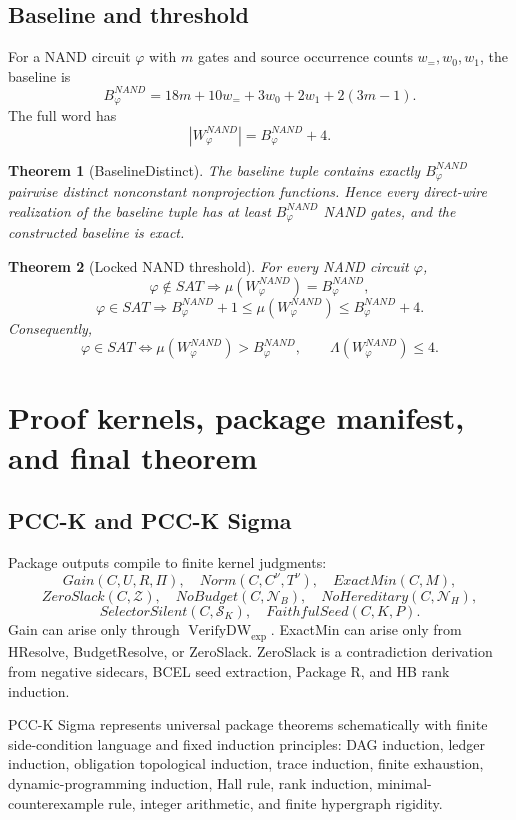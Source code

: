 \documentclass[10.5pt,a4paper]{article}
\newtheorem{theorem}{Theorem}[section]
\newcommand{\VerifyDW}{\operatorname{VerifyDW}_{\exp}}
\begin{document}
\subsection{Baseline and threshold}
For a NAND circuit \(\varphi\) with \(m\) gates and source occurrence counts \(w_=,w_0,w_1\), the baseline is
\[
B^{NAND}_\varphi=18m+10w_=+3w_0+2w_1+2(3m-1).
\]
The full word has
\[
|W^{NAND}_\varphi|=B^{NAND}_\varphi+4.
\]

\begin{theorem}[BaselineDistinct]
The baseline tuple contains exactly \(B^{NAND}_\varphi\) pairwise distinct nonconstant nonprojection functions. Hence every direct-wire realization of the baseline tuple has at least \(B^{NAND}_\varphi\) NAND gates, and the constructed baseline is exact.
\end{theorem}

\begin{theorem}[Locked NAND threshold]
For every NAND circuit \(\varphi\),
\[
\varphi\notin SAT\Longrightarrow \mu(W^{NAND}_\varphi)=B^{NAND}_\varphi,
\]
\[
\varphi\in SAT\Longrightarrow B^{NAND}_\varphi+1\le\mu(W^{NAND}_\varphi)\le B^{NAND}_\varphi+4.
\]
Consequently,
\[
\varphi\in SAT\Longleftrightarrow \mu(W^{NAND}_\varphi)>B^{NAND}_\varphi,
\qquad
\Lambda(W^{NAND}_\varphi)\le4.
\]
\end{theorem}

\section{Proof kernels, package manifest, and final theorem}

\subsection{PCC-K and PCC-K Sigma}
Package outputs compile to finite kernel judgments:
\[
Gain(C,U,R,\Pi),\quad Norm(C,C^\nu,T^\nu),\quad ExactMin(C,M),
\]
\[
ZeroSlack(C,\mathcal Z),\quad NoBudget(C,\mathcal N_B),\quad NoHereditary(C,\mathcal N_H),
\]
\[
SelectorSilent(C,\mathcal S_K),\quad FaithfulSeed(C,K,P).
\]
Gain can arise only through \(\VerifyDW\). ExactMin can arise only from HResolve, BudgetResolve, or ZeroSlack. ZeroSlack is a contradiction derivation from negative sidecars, BCEL seed extraction, Package R, and HB rank induction.

PCC-K Sigma represents universal package theorems schematically with finite side-condition language and fixed induction principles: DAG induction, ledger induction, obligation topological induction, trace induction, finite exhaustion, dynamic-programming induction, Hall rule, rank induction, minimal-counterexample rule, integer arithmetic, and finite hypergraph rigidity.
\end{document}
